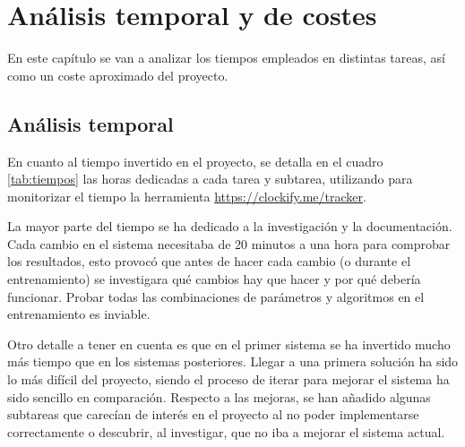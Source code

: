 \chapter{An\'alisis temporal y de costes}\label{anatemporal}

En este capítulo se van a analizar los tiempos empleados en distintas tareas, así como un coste aproximado del proyecto.

\section{Análisis temporal}

En cuanto al tiempo invertido en el proyecto, se detalla en el cuadro \ref{tab:tiempos} las horas dedicadas a cada tarea y subtarea, utilizando para monitorizar el tiempo la herramienta \url{https://clockify.me/tracker}.

La mayor parte del tiempo se ha dedicado a la investigación y la documentación. Cada cambio en el sistema necesitaba de 20 minutos a una hora para comprobar los resultados, esto provocó que antes de hacer cada cambio (o durante el entrenamiento) se investigara qué cambios hay que hacer y por qué debería funcionar. Probar todas las combinaciones de parámetros y algoritmos en el entrenamiento es inviable.

Otro detalle a tener en cuenta es que en el primer sistema se ha invertido mucho más tiempo que en los sistemas posteriores. Llegar a una primera solución ha sido lo más difícil del proyecto, siendo el proceso de iterar para mejorar el sistema ha sido sencillo en comparación. Respecto a las mejoras, se han añadido algunas subtareas que carecían de interés en el proyecto al no poder implementarse correctamente o descubrir, al investigar, que no iba a mejorar el sistema actual.

